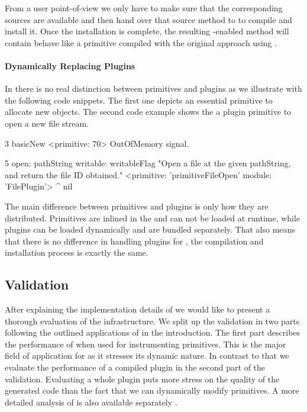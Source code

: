 From a user point-of-view we only have to make sure that the corresponding \Slang sources are available and then hand over that source method to \WF to compile and install it.
Once the installation is complete, the resulting \B-enabled method will contain behave like a \Slang primitive compiled with the original approach using \GCC.

\paragraph{Dynamically Replacing Plugins}
In \PH there is no real distinction between primitives and plugins as we illustrate with the following code snippets.
The first one depicts an essential primitive to allocate new objects.
The second code example shows the a plugin primitive to open a new file stream.
%
\begin{stcode}[
	caption={\ttt{Object>>\#basicNew} Primitive},
	label={lst:validation-basicnew}]{3}
basicNew
  <primitive: 70>
  OutOfMemory signal.
\end{stcode}
%
\begin{stcode}[caption={\ttt{FilePlugin>>\#open:writeable:} Plugin Primitive}]{5}
open: pathString writable: writableFlag
  "Open a file at the given pathString, and return
   the file ID obtained."
  <primitive: 'primitiveFileOpen' module: 'FilePlugin'>
  ^ nil
\end{stcode}
%
The main difference between primitives and plugins is only how they are distributed.
Primitives are inlined in the \VM and can not be loaded at runtime, while plugins can be loaded dynamically and are bundled separately.
That also means that there is no difference in handling plugins for \WF, the compilation and installation process is exactly the same.

\subsection{\WF Validation}
After explaining the implementation details of \WF we would like to present a thorough evaluation of the \WF infrastructure.
We split up the validation in two parts following the outlined applications of \WF in the introduction.
The first part describes the performance of \WF when used for instrumenting primitives.
This is the major field of application for \WF as it stresses its dynamic nature.
In contrast to that we evaluate the performance of a \WF compiled plugin in the second part of the validation.
Evaluating a whole plugin puts more stress on the quality of the generated code than the fact that we can dynamically modify primitives.
A more detailed analysis of \WF is also available separately \cite{Char13a}.


